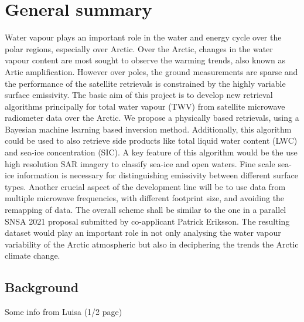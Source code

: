 \documentclass[12pt,oneside,a4paper]{article}
\begin{document}
	
	
	\thispagestyle{empty}
	\vspace*{-10mm}
	\noindent
	\textbf{\Large \LongTitle}




\section{General summary}

Water vapour plays an important role in the water and energy cycle over the polar regions, especially over Arctic. Over the Arctic, changes in the water vapour content are most sought to observe the warming trends, also known as Artic amplification. However over poles, the ground measurements are sparse and the performance of the satellite retrievals is constrained by the highly variable surface emissivity. The basic aim of this project is to develop new retrieval algorithms principally for total water vapour (TWV) from satellite microwave radiometer data over the Arctic. We propose a physically based retrievals, using a Bayesian machine learning based inversion method. Additionally, this algorithm could be used to also retrieve side products like total liquid water content (LWC) and sea-ice concentration (SIC). A key feature of this algorithm would be the use high resolution SAR imagery to classify sea-ice and open waters. Fine scale sea-ice information is necessary for distinguishing emissivity between different surface types. Another crucial aspect of the development line will be to use data from multiple microwave frequencies, with different footprint size, and avoiding the remapping of data. The overall scheme shall be similar to the one in a parallel SNSA 2021 proposal submitted by co-applicant Patrick Eriksson.
The resulting dataset would play an important role in not only analysing the water vapour variability of the Arctic atmospheric but also in deciphering the trends the Arctic climate change.


\subsection{Background}
%
\label{sec:background}
Some info from Luisa (1/2 page)
\end{document}
